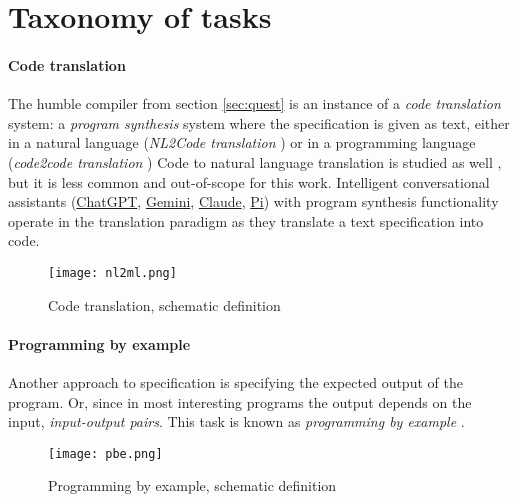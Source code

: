 
\newpage
\section{Taxonomy of tasks}
\label{sec:taxonomy}

\paragraph{Code translation}

The humble compiler from section \ref{sec:quest} is an instance of a \emph{code translation} system: a \emph{program synthesis} system where the specification is given as text, either in a natural language (\emph{NL2Code translation} \cite{wangNaturalLanguageCode2023, zanLargeLanguageModels2023}) or in a programming language (\emph{code2code translation} \cite{radfordImprovingLanguageUnderstanding})
Code to natural language translation is studied as well \cite[section 5.1]{leDeepLearningSource2020}, but it is less common and out-of-scope for this work.
Intelligent conversational assistants (\href{https://chat.openai.com/}{ChatGPT}, \href{https://gemini.google.com}{Gemini}, \href{https://claude.ai/}{Claude}, \href{https://pi.ai/}{Pi}) with program synthesis functionality operate in the translation paradigm as they translate a text specification into code.

\begin{figure}[H]
    \centering
    \texttt{[image: nl2ml.png]}
    \caption{Code translation, schematic definition}
    \label{fig:nl2ml}
\end{figure}

\paragraph{Programming by example}

Another approach to specification is specifying the expected output of the program. Or, since in most interesting programs the output depends on the input, \emph{input-output pairs}. This task is known as \emph{programming by example} \cite{halbertProgrammingExample1984, psb2}.

\begin{figure}[H]
    \centering
    \texttt{[image: pbe.png]}
    \caption{Programming by example, schematic definition}
    \label{fig:pbe}
\end{figure}

